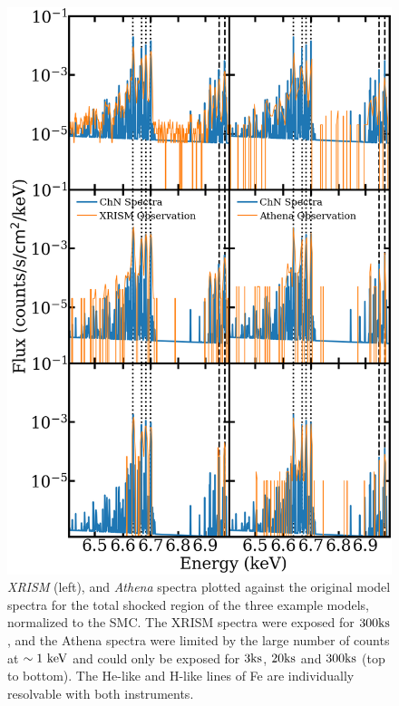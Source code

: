 \documentclass[twocolumn]{aastex631}
\begin{document}
\begin{figure}[htb]
    \centering
    \includegraphics[scale=0.23]{XRISM_athena.png}
    \caption{{\it XRISM} (left), and {\it Athena} spectra plotted against the original model spectra for the total shocked region of the three example models, normalized to the SMC. The XRISM spectra were exposed for $300 \rm ks$, and the Athena spectra were limited by the large number of counts at $\sim 1\ \rm keV$ and could only be exposed for $3 \rm ks$, $20 \rm ks$ and $300 \rm ks$ (top to bottom). The He-like and H-like lines of Fe are individually resolvable with both instruments.}
    \label{fig:fehires}
\end{figure}
\end{document}
